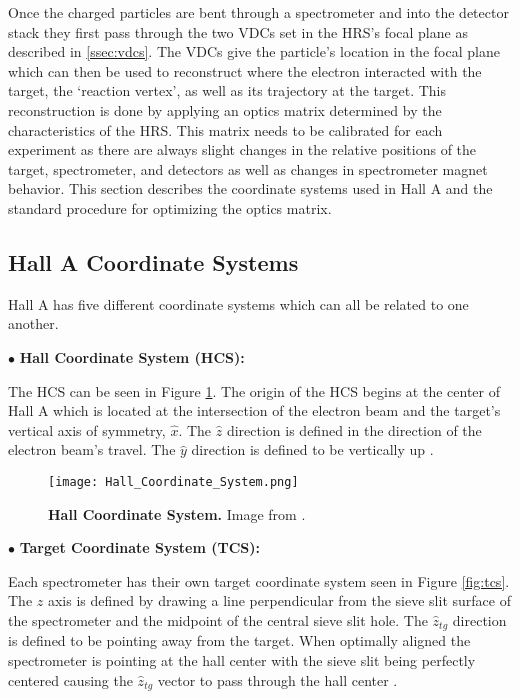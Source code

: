 Once the charged particles are bent through a spectrometer and into the detector stack they first pass through the two VDCs set in the HRS's focal plane as described in \ref{ssec:vdcs}. The VDCs give the particle's location in the focal plane which can then be used to reconstruct where the electron interacted with the target, the `reaction vertex', as well as its trajectory at the target. This reconstruction is done by applying an optics matrix determined by the characteristics of the HRS. This matrix needs to be calibrated for each experiment as there are always slight changes in the relative positions of the target, spectrometer, and detectors as well as changes in spectrometer magnet behavior. This section describes the coordinate systems used in Hall A and the standard procedure for optimizing the optics matrix. 

\subsection{Hall A Coordinate Systems}
\label{ssec:coordinates}

Hall A has five different coordinate systems which can all be related to one another. 

\noindent $\bullet$ \textbf{Hall Coordinate System (HCS):}

The HCS can be seen in Figure \ref{fig:hcs}. The origin of the HCS begins at the center of Hall A which is located at the intersection of the electron beam and the target's vertical axis of symmetry, $\hat{x}$. The $\hat{z}$ direction is defined in the direction of the electron beam's travel. The $\hat{y}$ direction is defined to be vertically up \cite{optics}.

\begin{figure}[!ht]
\begin{center}
\texttt{[image: Hall\_Coordinate\_System.png]}
\end{center}
\caption[Hall Coordinate System]{
{\bf{Hall Coordinate System.}} Image from \cite{optics}.}
\label{fig:hcs}
\end{figure}

\noindent $\bullet$ \textbf{Target Coordinate System (TCS):}

Each spectrometer has their own target coordinate system seen in Figure \ref{fig:tcs}. The $z$ axis is defined by drawing a line perpendicular from the sieve slit surface of the spectrometer and the midpoint of the central sieve slit hole. The $\hat{z}_{tg}$ direction is defined to be pointing away from the target. When optimally aligned the spectrometer is pointing at the hall center with the sieve slit being perfectly centered causing the $\hat{z}_{tg}$ vector to pass through the hall center \cite{optics}. 

